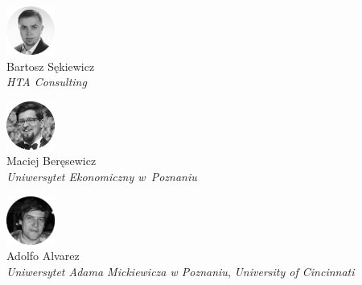 \begin{minipage}[t]{0.33\textwidth}
	\center     
    \includegraphics[width=60px]{img/people/czarno_biale/bartosz-crop.png}   \\
    Bartosz Sękiewicz \\ 
    \textit{HTA Consulting}
\end{minipage}
\begin{minipage}[t]{0.33\textwidth}
	\center 
    \includegraphics[width=60px]{img/people/czarno_biale/maciej-crop.png}    \\
    Maciej Beręsewicz \\
	\textit{Uniwersytet Ekonomiczny w~Poznaniu}  
\end{minipage}
\begin{minipage}[t]{0.33\textwidth}
	\center     
    \includegraphics[width=60px]{img/people/czarno_biale/adolfo-crop.png}   \\
    Adolfo Alvarez \\
	\textit{Uniwersytet Adama Mickiewicza w Poznaniu}, \textit{University of Cincinnati}
\end{minipage}

